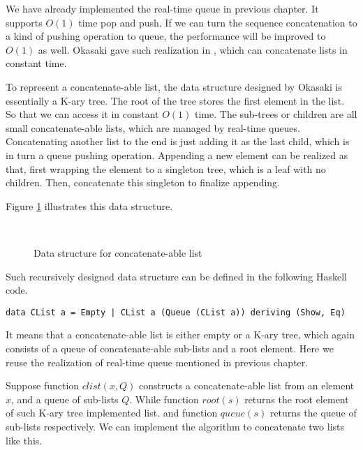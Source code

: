 \documentclass[UTF8]{article}
\begin{document}
We have already implemented the real-time queue in previous chapter. It supports
$O(1)$ time pop and push. If we can turn the sequence concatenation to a kind
of pushing operation to queue, the performance will be improved to $O(1)$ as well.
Okasaki gave such realization in \cite{okasaki-book}, which can concatenate
lists in constant time.

To represent a concatenate-able list, the data structure designed by Okasaki is
essentially a K-ary tree. The root of the tree stores the first element in the
list. So that we can access it in constant $O(1)$ time. The sub-trees or children
are all small concatenate-able lists, which are managed by real-time queues.
Concatenating another list to the end is just adding it as the last child, which
is in turn a queue pushing operation. Appending a new element can be realized
as that, first wrapping the element to a singleton tree, which is a leaf with
no children. Then, concatenate this singleton to finalize appending.

Figure \ref{fig:clist} illustrates this data structure.

\begin{figure}[htbp]
  \centering
   \\
  \caption{Data structure for concatenate-able list} \label{fig:clist}
\end{figure}

Such recursively designed data structure can be defined in the following
Haskell code.

\lstset{language=Haskell}
\begin{lstlisting}
data CList a = Empty | CList a (Queue (CList a)) deriving (Show, Eq)
\end{lstlisting}

It means that a concatenate-able list is either empty or a K-ary tree, which
again consists of a queue of concatenate-able sub-lists and a root element.
Here we reuse the realization of real-time queue mentioned in previous
chapter.

Suppose function $clist(x, Q)$ constructs a concatenate-able list from
an element $x$, and a queue of sub-lists $Q$. While function $root(s)$
returns the root element of such K-ary tree implemented list. and
function $queue(s)$ returns the queue of sub-lists respectively.
We can implement the algorithm
to concatenate two lists like this.
\end{document}
